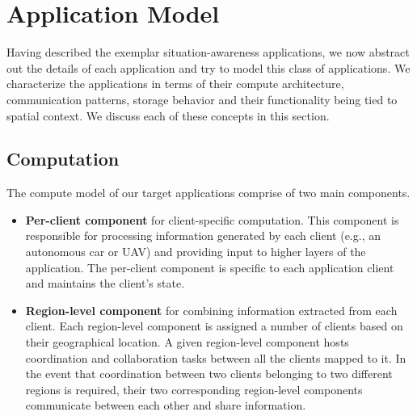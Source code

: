 \section{Application Model}
Having described the exemplar situation-awareness applications, we now abstract out the details of each application and try to model this class of applications. We characterize the applications in terms of their compute architecture, communication patterns, storage behavior and their functionality being tied to spatial context. We discuss each of these concepts in this section.

\subsection{Computation}
\label{sec:app_model_compute}
The compute model of our target applications comprise of two main components.
\begin{itemize}
\item \textbf{Per-client component} for client-specific computation. This component is responsible for processing information generated by each client (e.g., an autonomous car or UAV) and providing input to higher layers of the application. The per-client component is specific to each application client and maintains the client's state.
\item \textbf{Region-level component} for combining information extracted from each client. Each region-level component is assigned a number of clients based on their geographical location. A given region-level component hosts  coordination and collaboration tasks between all the clients mapped to it. In the event that coordination between two clients belonging to two different regions is required, their two corresponding region-level components communicate between each other and share information.
\end{itemize}
